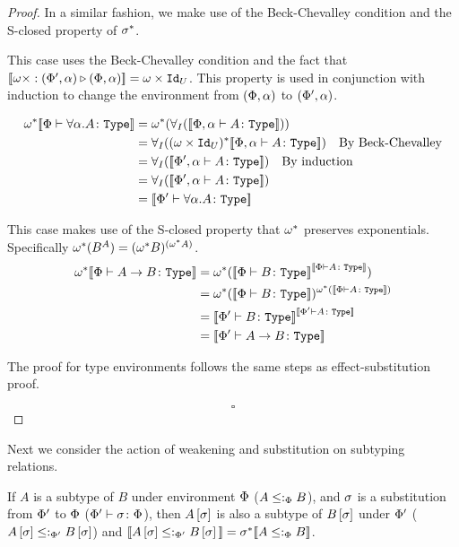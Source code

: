 \documentclass{Report}
\begin{document}
\begin{proof}
   In a similar fashion, we make use of the Beck-Chevalley condition and the S-closed property of $\si\star$.

        This case uses the Beck-Chevalley condition and the fact that $\deno{\wrel{\w\x}{(\P', \a)}{(\P,\a)}} = \w\times \Id{U}$. This property is used in conjunction with induction to change the environment from $(\P, \a)$ to $(\P', \a)$.

        \begin{align}
            \w\star\deno{\typerelation{\P}{\all{\a}A}{\type}} & = \w\star(\allI(\deno{\typerelation{\P,\a}{A}{\type}}))\\
            & = \allI((\w\times\Id{U})\star\deno{\typerelation{\P,\a}{A}{\type}})\qt{By Beck-Chevalley}\\
            & = \allI(\deno{\typerelation{\P',\a}{A}{\type}})\qt{By induction}\\
            & = \allI(\deno{\typerelation{\P',\a}{A}{\type}})\\
            & = \deno{\typerelation{\P'}{\all{\a}{A}}{\type}}\\
        \end{align}
    
    This case makes use of the S-closed property that $\w\star$ preserves exponentials. Specifically $\w\star(B^A) = (\w\star B)^{(\w\star A)}$.
    \begin{align}
        \w\star\deno{\typerelation{\P}{\ab}{\type}} &= \w\star(\deno{\typerelation{\P}{B}{\type}}^{\deno{\typerelation{\P}{A}{\type}}})\\
        &=\w\star(\deno{\typerelation{\P}{B}{\type}})^{\w\star(\deno{\typerelation{\P}{A}{\type}})}\\
        & = \deno{\typerelation{\P'}{B}{\type}}^{\deno{\typerelation{\P'}{A}{\type}}}\\
        & = \deno{\typerelation{\P'}{\ab}{\type}}\\
    \end{align}

    
    The proof for type environments follows the same steps as effect-substitution proof.

    $$\square$$
\end{proof}


Next we consider the action of weakening and substitution on subtyping relations. 

\begin{theorem}
    If $A$ is a subtype of $B$ under environment $\P$ ($A \subtypep B$), and $\si$ is a substitution from $\P'$ to $\P$ ($\typerelation{\P'}{\si}{\P}$), then $A\ssi$ is also a subtype of $B\ssi$ under $\P'$ ($A\ssi\subtypepp B\ssi$) and $\deno{A\ssi\subtypepp B\ssi} = \si\star\deno{A\subtypep B}$.
\end{theorem}
\end{document}

